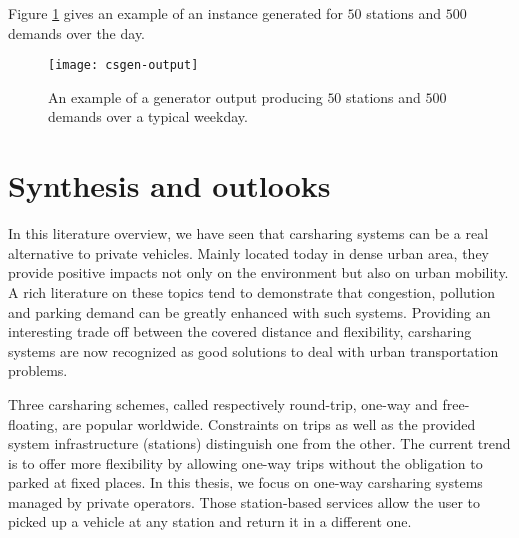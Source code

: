Figure \ref{fig:csgen-output} gives an example of an instance generated for $50$ stations and $500$ demands over the day.


\begin{figure}[!h]
\centering
\texttt{[image: csgen-output]}
\caption{An example of a generator output producing $50$ stations and $500$ demands over a typical weekday.}
\label{fig:csgen-output}
\end{figure}






\section{Synthesis and outlooks}

In this literature overview, we have seen that carsharing systems can be a real alternative to private vehicles.
Mainly located today in dense urban area, they provide positive impacts not only on the environment but also on urban mobility.
A rich literature on these topics tend to demonstrate that congestion, pollution and parking demand can be greatly enhanced with such systems.
Providing an interesting trade off between the covered distance and flexibility, carsharing systems are now recognized as good solutions to deal with urban transportation problems.

\medskip
Three carsharing schemes, called respectively round-trip, one-way and free-floating, are popular worldwide.
Constraints on trips as well as the provided system infrastructure (stations) distinguish one from the other.
The current trend is to offer more flexibility by allowing one-way trips without the obligation to parked at fixed places.
In this thesis, we focus on one-way carsharing systems managed by private operators.
Those station-based services allow the user to picked up a vehicle at any station and return it in a different one.


